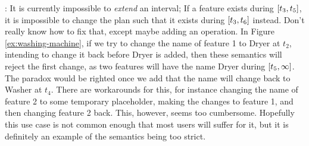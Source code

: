 : It is currently impossible to \emph{extend} an interval; If a feature exists during $\interval{t_3}{t_5}$, it is impossible to change the plan such that it exists during $\interval{t_3}{t_6}$ instead. Don't really know how to fix that, except maybe adding an operation. In Figure \vref{ex:washing-machine}, if we try to change the name of feature 1 to Dryer at $t_2$, intending to change it back before Dryer is added, then these semantics will reject the first change, as two features will have the name Dryer during $\interval{t_5}{\infty}$. The paradox would be righted once we add that the name will change back to Washer at $t_4$. There are workarounds for this, for instance changing the name of feature 2 to some temporary placeholder, making the changes to feature 1, and then changing feature 2 back. This, however, seems too cumbersome. Hopefully this use case is not common enough that most users will suffer for it, but it is definitely an example of the semantics being too strict. 
